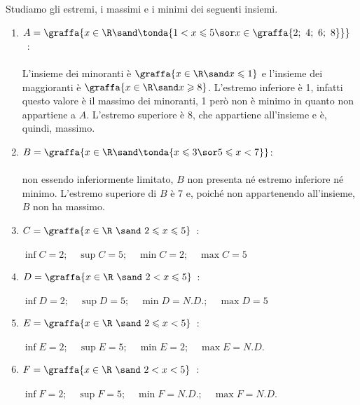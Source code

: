 \begin{esempio}Studiamo gli estremi, i massimi e i minimi dei seguenti 
insiemi. %
\begin{enumerate}
\item 
\(A = \graffa{x\in\R \sand \tonda{1 < x \leqslant 5 \sor 
                                  x \in \graffa{2;~4;~6;~8}}}\)~:\\
\\
L'insieme dei minoranti è \(\graffa{x\in\R \sand x \leqslant 1}\) e
l'insieme dei maggioranti è \(\graffa{x\in\R \sand x \geqslant 8}\).
L'estremo inferiore è 1, infatti questo valore è il massimo 
dei minoranti, 1 però non è minimo in quanto non appartiene a \(A\). 
L'estremo superiore è 8, che appartiene all'insieme e è, quindi, massimo. 

\item \(B =\graffa{x \in \R \sand \tonda{x \leqslant 3 \sor 5 \leqslant x < 
7}}\): \\
\\
non essendo inferiormente limitato, \(B\) non presenta né estremo inferiore 
né minimo. 
L'estremo superiore di \(B\) è 7 e, poiché non appartenendo all'insieme, 
\(B\) non ha massimo.

\item \(C = \graffa{x\in\R~\sand~ 2 \leqslant x \leqslant 5}\)~: \\
\\
\(\inf{C} = 2; \quad \sup{C} = 5; \quad \min{C} = 2; \quad \max{C} = 5\) 

\item \(D = \graffa{x\in\R~\sand~ 2 < x \leqslant 5}\)~: \\
\\
\(\inf{D} = 2; \quad \sup{D} = 5; \quad \min{D} = N.D.; \quad \max{D} = 5\)

\item \(E = \graffa{x\in\R~\sand~ 2 \leqslant x < 5}\)~: \\
\\
\(\inf{E} = 2; \quad \sup{E} = 5; \quad \min{E} = 2; \quad \max{E} = N.D.\)

\item \(F = \graffa{x\in\R~\sand~ 2 < x < 5}\)~: \\
\\
\(\inf{F} = 2; \quad \sup{F} = 5;\quad \min{F} = N.D.;\quad 
  \max{F} = N.D.\)
\end{enumerate}
\end{esempio}

